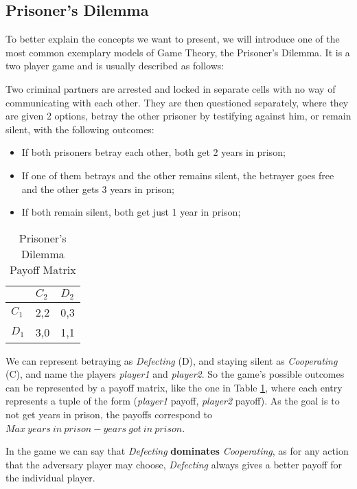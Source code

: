 \subsection{Prisoner's Dilemma}
\label{subsec:PrisonersDilemma}
To better explain the concepts we want to present, we will introduce one of the most common exemplary models of Game Theory, the Prisoner's Dilemma. It is a two player game and is usually described as follows:

Two criminal partners are arrested and locked in separate cells with no way of communicating with each other. They are then questioned separately, where they are given 2 options, betray the other prisoner by testifying against him, or remain silent, with the following outcomes:
\begin{itemize}
    \item If both prisoners betray each other, both get 2 years in prison;
    \item If one of them betrays and the other remains silent, the betrayer goes free and the other gets 3 years in prison;
    \item If both remain silent, both get just 1 year in prison;
\end{itemize}

\begin{table}[h]
    \centering
    \normalsize{
        \footnotesize
        \begin{tabular}{l|l|l|}
            \cline{2-3}
            & $C_2$   & $D_2$   \\ \hline
            \multicolumn{1}{|l|}{$C_1$} & 2,2 & 0,3 \\ \hline
            \multicolumn{1}{|l|}{$D_1$} & 3,0 & 1,1 \\ \hline
        \end{tabular}
    }
    \caption{Prisoner's Dilemma Payoff Matrix}
    \label{tbl:PrisonerDilemaPayoffMatrix}
\end{table}	
We can represent betraying as \textit{Defecting} (D), and staying silent as \textit{Cooperating} (C), and name the players \textit{player1} and \textit{player2}. So the game's possible outcomes can be represented by a payoff matrix, like the one in Table \ref{tbl:PrisonerDilemaPayoffMatrix}, where each entry represents a tuple of the form (\textit{player1} payoff, \textit{player2} payoff). As the goal is to not get years in prison, the payoffs correspond to $Max\ years\ in\ prison - years\ got\ in\ prison$.


In the game we can say that \textit{Defecting} \textbf{dominates} \textit{Cooperating}, as for any action that the adversary player may choose, \textit{Defecting} always gives a better payoff for the individual player\cite{Nash1951}.

